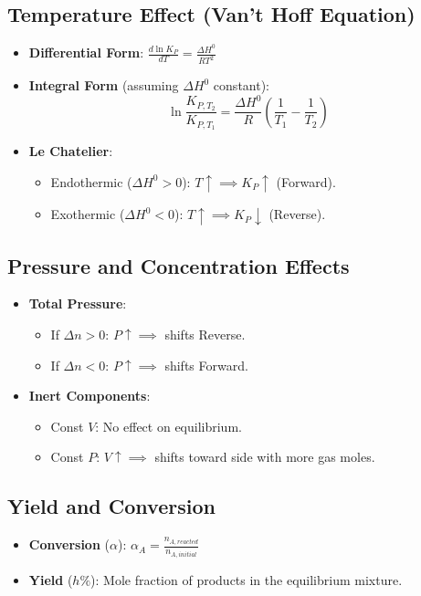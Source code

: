 \subsection{Temperature Effect (Van't Hoff Equation)}
\begin{itemize}
    \item \textbf{Differential Form}: $\frac{d \ln K_P}{dT} = \frac{\Delta H^0}{RT^2}$
    \item \textbf{Integral Form} (assuming $\Delta H^0$ constant):
    \begin{equation}
        \ln \frac{K_{P,T_2}}{K_{P,T_1}} = \frac{\Delta H^0}{R} \left( \frac{1}{T_1} - \frac{1}{T_2} \right)
    \end{equation}
    \item \textbf{Le Chatelier}:
    \begin{itemize}
        \item Endothermic ($\Delta H^0 > 0$): $T \uparrow \implies K_P \uparrow$ (Forward).
        \item Exothermic ($\Delta H^0 < 0$): $T \uparrow \implies K_P \downarrow$ (Reverse).
    \end{itemize}
\end{itemize}

\subsection{Pressure and Concentration Effects}
\begin{itemize}
    \item \textbf{Total Pressure}:
    \begin{itemize}
        \item If $\Delta n > 0$: $P \uparrow \implies$ shifts Reverse.
        \item If $\Delta n < 0$: $P \uparrow \implies$ shifts Forward.
    \end{itemize}
    \item \textbf{Inert Components}:
    \begin{itemize}
        \item Const $V$: No effect on equilibrium.
        \item Const $P$: $V \uparrow \implies$ shifts toward side with more gas moles.
    \end{itemize}
\end{itemize}

\subsection{Yield and Conversion}
\begin{itemize}
    \item \textbf{Conversion} ($\alpha$): $\alpha_A = \frac{n_{A, reacted}}{n_{A, initial}}$
    \item \textbf{Yield} ($h\%$): Mole fraction of products in the equilibrium mixture.
\end{itemize}
\vspace{0.2cm}
